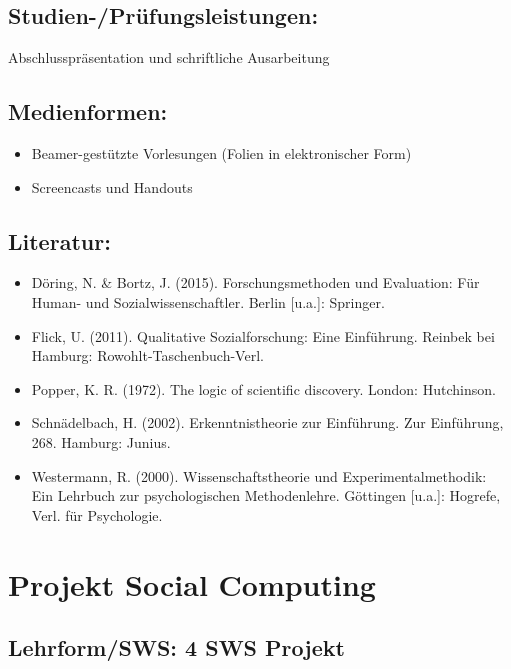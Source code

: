 \section{Studien-/Prüfungsleistungen:}\label{studien-pruxfcfungsleistungen-21}

Abschlusspräsentation und schriftliche Ausarbeitung

\section{Medienformen:}\label{medienformen-21}

\begin{itemize}
\tightlist
\item
  Beamer-gestützte Vorlesungen (Folien in elektronischer Form)
\item
  Screencasts und Handouts
\end{itemize}

\section{Literatur:}\label{literatur-21}

\begin{itemize}
\tightlist
\item
  Döring, N. \& Bortz, J. (2015). Forschungsmethoden und Evaluation: Für
  Human- und Sozialwissenschaftler. Berlin {[}u.a.{]}: Springer.
\item
  Flick, U. (2011). Qualitative Sozialforschung: Eine Einführung.
  Reinbek bei Hamburg: Rowohlt-Taschenbuch-Verl.
\item
  Popper, K. R. (1972). The logic of scientific discovery. London:
  Hutchinson.
\item
  Schnädelbach, H. (2002). Erkenntnistheorie zur Einführung. Zur
  Einführung, 268. Hamburg: Junius.
\item
  Westermann, R. (2000). Wissenschaftstheorie und Experimentalmethodik:
  Ein Lehrbuch zur psychologischen Methodenlehre. Göttingen {[}u.a.{]}:
  Hogrefe, Verl. für Psychologie.
\end{itemize}

\chapter{Projekt Social Computing}\label{projekt-social-computing}

\section{Lehrform/SWS: 4 SWS
Projekt}\label{lehrformsws-4-sws-projekt}

